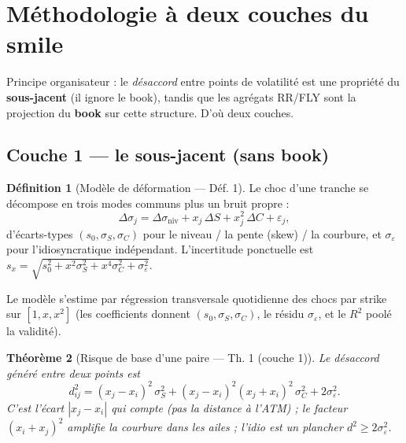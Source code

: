\documentclass[11pt,a4paper]{article}
\newcommand{\dsig}{\Delta\sigma}
\newcommand{\abs}[1]{\left| #1 \right|}
\theoremstyle{plain}
\newtheorem{theoreme}{Théorème}[section]
\theoremstyle{definition}
\newtheorem{definition}[theoreme]{Définition}
\theoremstyle{remark}
\begin{document}
\section{Méthodologie à deux couches du smile}\label{sec:twolayer}

Principe organisateur : le \emph{désaccord} entre points de volatilité est une
propriété du \textbf{sous-jacent} (il ignore le book), tandis que les agrégats RR/FLY
sont la projection du \textbf{book} sur cette structure. D'où deux couches.

\subsection{Couche 1 --- le sous-jacent (sans book)}

\begin{definition}[Modèle de déformation --- Déf. 1]\label{def:smile}
Le choc d'une tranche se décompose en trois modes communs plus un bruit propre :
\begin{equation}
\dsig_j = \dsig_{\mathrm{niv}} + x_j\,\Delta S + x_j^2\,\Delta C + \varepsilon_j,
\end{equation}
d'écarts-types $(s_0, \sigma_S, \sigma_C)$ pour le niveau / la pente (skew) / la
courbure, et $\sigma_\varepsilon$ pour l'idiosyncratique indépendant. L'incertitude
ponctuelle est
$s_x = \sqrt{s_0^2 + x^2\sigma_S^2 + x^4\sigma_C^2 + \sigma_\varepsilon^2}$.
\end{definition}

Le modèle s'estime par régression transversale quotidienne des chocs par strike sur
$[1, x, x^2]$ (les coefficients donnent $(s_0,\sigma_S,\sigma_C)$, le résidu
$\sigma_\varepsilon$, et le $R^2$ poolé la validité).

\begin{theoreme}[Risque de base d'une paire --- Th. 1 (couche 1)]\label{th:tl1}
Le désaccord généré entre deux points est
\begin{equation}
d_{ij}^2 = (x_j-x_i)^2\,\sigma_S^2 + (x_j-x_i)^2(x_j+x_i)^2\,\sigma_C^2
+ 2\sigma_\varepsilon^2 .
\label{eq:tl-dist}
\end{equation}
C'est l'\emph{écart} $\abs{x_j-x_i}$ qui compte (pas la distance à l'ATM) ; le facteur
$(x_i+x_j)^2$ amplifie la courbure dans les ailes ; l'idio est un plancher
$d^2 \ge 2\sigma_\varepsilon^2$.
\end{theoreme}
\end{document}
